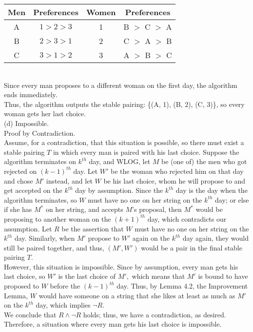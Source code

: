 \documentclass{article}
\begin{document}
\begin{tabular}{ | c | c || c | c | }
\hline
Men & Preferences & Women & Preferences \\
\hline
A & $1>2>3$ & 1 & B $>$ C $>$ A \\
B & $2>3>1$ & 2 & C $>$ A $>$ B \\
C & $3>1>2$ & 3 & A $>$ B $>$ C \\
\hline
\end{tabular}\\[.3cm]
\indent Since every man proposes to a different woman on the first day, the algorithm ends immediately.\\
\indent Thus, the algorithm outputs the stable pairing: \{(A, 1), (B, 2), (C, 3)\}, so every woman gets her last choice.\\[.5cm]
(d) Impossible.\\[.15cm]
\indent Proof by Contradiction.\\ [.1cm]
\indent Assume, for a contradiction, that this situation is possible, so there must exist a stable pairing $T$ in which every man is paired with his last choice. Suppose the algorithm terminates on $k^{th}$ day, and WLOG, let $M$ be (one of) the men who got rejected on $(k-1)^{th}$ day. Let $W'$ be the woman who rejected him on that day and chose $M'$ instead, and let $W$ be his last choice, whom he will propose to and get accepted on the $k^{th}$ day by assumption. Since the $k^{th}$ day is the day when the algorithm terminates, so $W$ must have no one on her string on the $k^{th}$ day; or else if she has $M^*$ on her string, and accepts $M$'s proposal, then $M^*$ would be proposing to another woman on the $(k+1)^{th}$ day, which contradicts our assumption. Let $R$ be the assertion that $W$ must have no one on her string on the $k^{th}$ day. Similarly, when $M'$ propose to $W'$ again on the $k^{th}$ day again, they would still be paired together, and thus, $(M', W')$ would be a pair in the final stable pairing $T.$ \\[.1cm]
\indent However, this situation is impossible. Since by assumption, every man gets his last choice, so $W'$ is the last choice of $M',$ which means that $M'$ is bound to have proposed to $W$ before the $(k-1)^{th}$ day. Thus, by Lemma 4.2, the Improvement Lemma, $W$ would have someone on a string that she likes at least as much as $M'$ on the $k^{th}$ day, which implies $\neg R$. \\[.1cm]
\indent We conclude that $R\land\neg R$ holds; thus, we have a contradiction, as desired. Therefore, a situation where every man gets his last choice is impossible.\\[.1cm]
\end{document}
